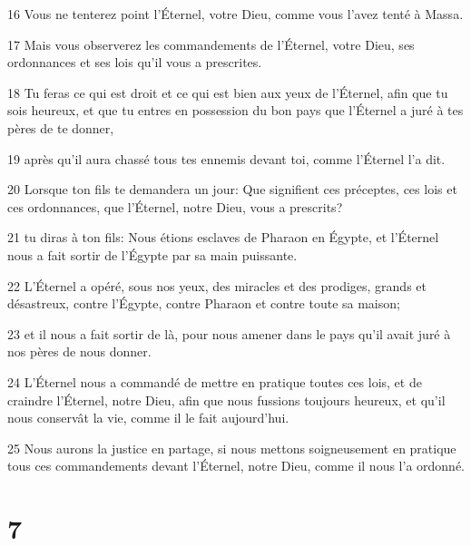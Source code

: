 \par 16 Vous ne tenterez point l'Éternel, votre Dieu, comme vous l'avez tenté à Massa.
\par 17 Mais vous observerez les commandements de l'Éternel, votre Dieu, ses ordonnances et ses lois qu'il vous a prescrites.
\par 18 Tu feras ce qui est droit et ce qui est bien aux yeux de l'Éternel, afin que tu sois heureux, et que tu entres en possession du bon pays que l'Éternel a juré à tes pères de te donner,
\par 19 après qu'il aura chassé tous tes ennemis devant toi, comme l'Éternel l'a dit.
\par 20 Lorsque ton fils te demandera un jour: Que signifient ces préceptes, ces lois et ces ordonnances, que l'Éternel, notre Dieu, vous a prescrits?
\par 21 tu diras à ton fils: Nous étions esclaves de Pharaon en Égypte, et l'Éternel nous a fait sortir de l'Égypte par sa main puissante.
\par 22 L'Éternel a opéré, sous nos yeux, des miracles et des prodiges, grands et désastreux, contre l'Égypte, contre Pharaon et contre toute sa maison;
\par 23 et il nous a fait sortir de là, pour nous amener dans le pays qu'il avait juré à nos pères de nous donner.
\par 24 L'Éternel nous a commandé de mettre en pratique toutes ces lois, et de craindre l'Éternel, notre Dieu, afin que nous fussions toujours heureux, et qu'il nous conservât la vie, comme il le fait aujourd'hui.
\par 25 Nous aurons la justice en partage, si nous mettons soigneusement en pratique tous ces commandements devant l'Éternel, notre Dieu, comme il nous l'a ordonné.

\chapter{7}

